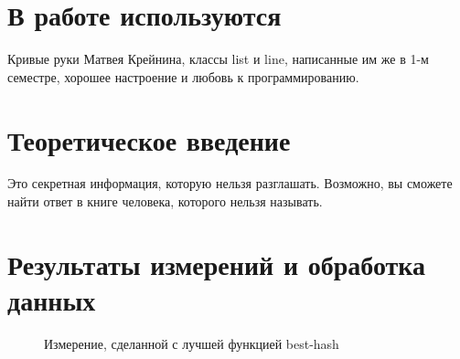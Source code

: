 \documentclass[a4paper,12pt]{article}
\begin{document}
\section*{В работе используются}
Кривые руки Матвея Крейнина, классы list и line, написанные им же в 1-м семестре, хорошее настроение и любовь к программированию.

\section*{Теоретическое введение}

Это секретная информация, которую нельзя разглашать.
Возможно, вы сможете найти ответ в книге человека, которого нельзя называть.

\section*{Результаты измерений и обработка данных}

\begin{figure}[h]
	\caption{Измерение, сделанной с лучшей функцией best-hash}
\end{figure}
\end{document}
